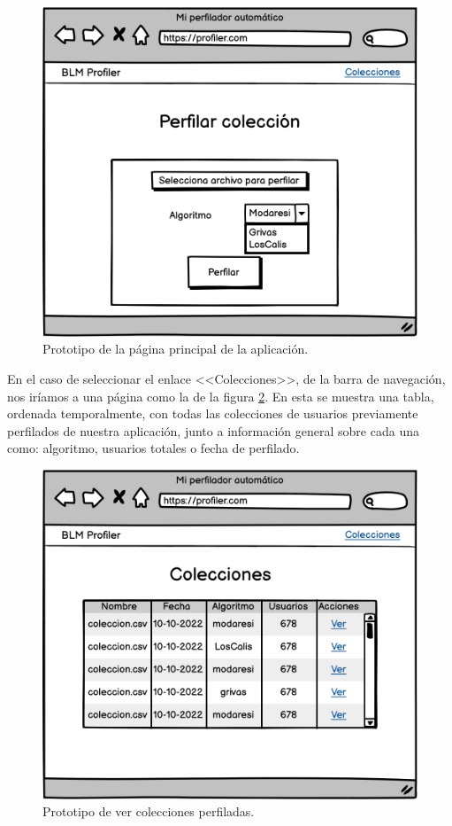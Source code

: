 \begin{figure}[H]
  \centering
  \includegraphics[width=\textwidth]{imaxes/prototipo/home.png}
  \caption{Prototipo de la página principal de la aplicación.}
  \label{fig:proto-home}
\end{figure}

En el caso de seleccionar el enlace <<Colecciones>>, de la barra de navegación, nos iríamos a una página como la de la figura \ref{fig:proto-collections}. En esta se muestra una tabla, ordenada temporalmente, con todas las colecciones de usuarios previamente perfilados de nuestra aplicación, junto a información general sobre cada una como: algoritmo, usuarios totales o fecha de perfilado.

\begin{figure}[H]
  \centering
  \includegraphics[width=\textwidth]{imaxes/prototipo/collections.png}
  \caption{Prototipo de ver colecciones perfiladas.}
  \label{fig:proto-collections}
\end{figure}

